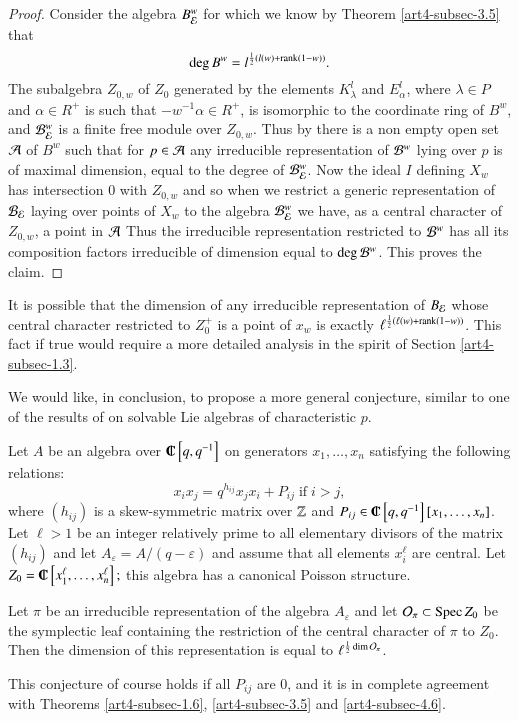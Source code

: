 \begin{proof}
Consider the algebra $B_{\mathcal{E}}^{w}$ for which we know by Theorem \ref{art4-subsec-3.5} that
$$
\deg B^{w} = l^{\frac{1}{2}(l(w)+\operatorname{rank}(1-w))}.
$$
The subalgebra $Z_{0, w}$ of $Z_{0}$ generated by the elements $K_{\lambda}^{l}$ and $E_{\alpha}^{l}$, where $\lambda \in P$ and $\alpha \in R^{+}$ is such that $-w^{-1}\alpha \in R^{+}$, is isomorphic to the coordinate ring of $B^{w}$, and $\mathcal{B}_{\mathcal{E}}^{w}$ is a finite free module over $Z_{0, w}$. Thus by \cite{art4-keyDKP2} there is a non empty open set $\mathcal{A}$ of $B^{w}$ such that for  $p\in \mathcal{A}$ any irreducible representation of $\mathcal{B}^{w}$ lying over $p$ is of maximal dimension, equal to the degree of $\mathcal{B}_{\mathcal{E}}^{w}$. Now the ideal $I$ defining $X_{w}$ has intersection $0$ with $Z_{0, w}$ and so when we restrict a generic representation of $\mathcal{B}_{\mathcal{E}}$ laying over points of $X_{w}$ to the algebra $\mathcal{B}_{\mathcal{E}}^{w}$ we have, as a central character of $Z_{0, w}$, a point in $\mathcal{A}$ Thus the irreducible representation restricted to $\mathcal{B}^{w}$ has all its composition factors irreducible of dimension equal to $\deg\mathcal{B}^{w}$. This proves the claim.  
\end{proof}

It is possible that the dimension of any irreducible representation of $B_{\mathcal{E}}$ whose central character restricted to $Z_{0}^{+}$ is  a point of $x_{w}$ is exactly $\ell^{\frac{1}{2}(\ell(w)+\operatorname{rank}(1-w))}$. This fact if true would require a more detailed analysis in the spirit of Section \ref{art4-subsec-1.3}.

We would like, in conclusion, to propose a more general conjecture, similar to one of the results of \cite{WK} on solvable Lie algebras of characteristic $p$.

Let $A$ be an algebra over ${\IC}\left[q, q^{-1}\right]$ on generators $x_{1}, \ldots, x_{n}$ satisfying the following relations:
$$
x_{i}x_{j}= q^{h_{ij}}x_{j}x_{i}+ P_{ij}\; \text{if} \; i > j,
$$
where $(h_{ij})$ is a skew-symmetric matrix over $\mathbb{Z}$ and $P_{ij}\in \IC\left[q, q^{-1}\right]\break\left[x_{1}, \ldots, x_{n}\right]$. Let $\ell > 1$ be an integer relatively prime to all elementary divisors of the matrix $(h_{ij})$ and let $A_{\varepsilon} = A/(q -\varepsilon)$ and assume that all elements $x_{i}^{\ell}$ are central. Let $Z_{0} = \IC\left[x_{1}^{\ell}, \ldots, x_{n}^{\ell}\right];$ this algebra has a canonical Poisson structure.

\begin{conjecture*}
Let $\pi$ be an irreducible representation of the algebra $A_{\varepsilon}$ and let $\mathcal{O}_{\pi} \subset \operatorname{Spec} Z_{0}$ be the symplectic leaf containing the restriction of the central character of $\pi$ to $Z_{0}$. Then the dimension of this representation is equal to $\ell^{\frac{1}{2}\dim \mathcal{O}_{\pi}}$.

This conjecture of course holds if all $P_{ij}$ are 0, and it is in complete agreement with Theorems \ref{art4-subsec-1.6}, \ref{art4-subsec-3.5} and \ref{art4-subsec-4.6}.
\end{conjecture*}


